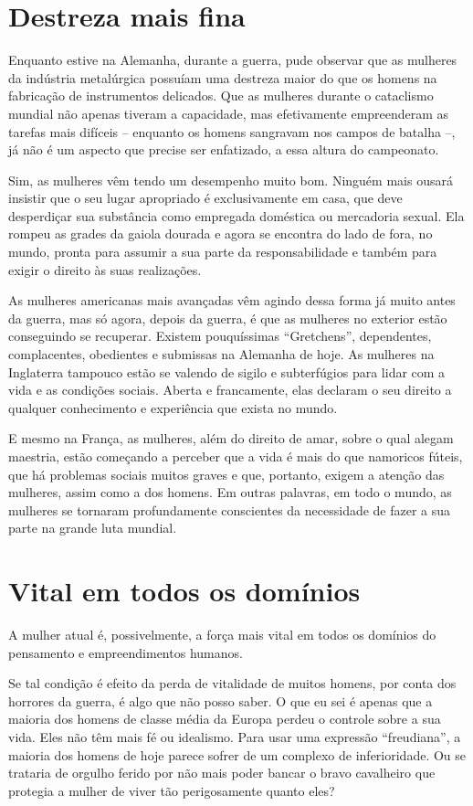 \section{Destreza mais fina}

Enquanto estive na Alemanha, durante a guerra, pude observar que as
mulheres da indústria metalúrgica possuíam uma destreza maior do que os
homens na fabricação de instrumentos delicados. Que as mulheres durante
o cataclismo mundial não apenas tiveram a capacidade, mas efetivamente
empreenderam as tarefas mais difíceis -- enquanto os homens sangravam
nos campos de batalha --, já não é um aspecto que precise ser
enfatizado, a essa altura do campeonato.

Sim, as mulheres vêm tendo um desempenho muito bom. Ninguém mais ousará
insistir que o seu lugar apropriado é exclusivamente em casa, que deve
desperdiçar sua substância como empregada doméstica ou mercadoria
sexual. Ela rompeu as grades da gaiola dourada e agora se encontra do
lado de fora, no mundo, pronta para assumir a sua parte da
responsabilidade e também para exigir o direito às suas realizações.

As mulheres americanas mais avançadas vêm agindo dessa forma já muito
antes da guerra, mas só agora, depois da guerra, é que as mulheres no
exterior estão conseguindo se recuperar. Existem pouquíssimas
``Gretchens'', dependentes, complacentes, obedientes e submissas na
Alemanha de hoje. As mulheres na Inglaterra tampouco estão se valendo de
sigilo e subterfúgios para lidar com a vida e as condições sociais.
Aberta e francamente, elas declaram o seu direito a qualquer
conhecimento e experiência que exista no mundo.

E mesmo na França, as mulheres, além do direito de amar, sobre o qual
alegam maestria, estão começando a perceber que a vida é mais do que
namoricos fúteis, que há problemas sociais muitos graves e que,
portanto, exigem a atenção das mulheres, assim como a dos homens. Em
outras palavras, em todo o mundo, as mulheres se tornaram profundamente
conscientes da necessidade de fazer a sua parte na grande luta mundial.

\section{Vital em todos os domínios}

A mulher atual é, possivelmente, a força mais vital em todos os domínios
do pensamento e empreendimentos humanos.

Se tal condição é efeito da perda de vitalidade de muitos homens, por
conta dos horrores da guerra, é algo que não posso saber. O que eu sei é
apenas que a maioria dos homens de classe média da Europa perdeu o
controle sobre a sua vida. Eles não têm mais fé ou idealismo. Para usar
uma expressão ``freudiana'', a maioria dos homens de hoje parece sofrer
de um complexo de inferioridade. Ou se trataria de orgulho ferido por
não mais poder bancar o bravo cavalheiro que protegia a mulher de viver
tão perigosamente quanto eles?


